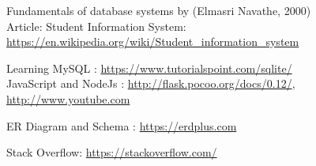 \cleardoublepage
{}

\begin{thebibliography}{99}

\bibitem{}Fundamentals of database systems by (Elmasri Navathe, 2000)\\
Article: Student Information System: \url{https://en.wikipedia.org/wiki/Student_information_system}

\bibitem{} Learning MySQL : \url{https://www.tutorialspoint.com/sqlite/}\\
JavaScript and NodeJs : \url{http://flask.pocoo.org/docs/0.12/}, \url{http://www.youtube.com}

\bibitem{} ER Diagram and Schema : \url{https://erdplus.com}

\bibitem{} Stack Overflow: \url{https://stackoverflow.com/}

\end{thebibliography}

